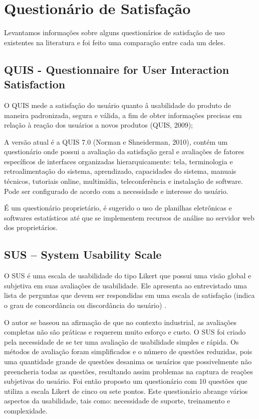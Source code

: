 \section{Questionário de Satisfação}

	Levantamos informações sobre alguns questionários de satisfação de uso existentes na literatura e foi feito uma comparação entre cada um deles.

\subsection{QUIS - Questionnaire for User Interaction Satisfaction}

	O QUIS mede a satisfação do usuário quanto â usabilidade do produto de maneira padronizada, segura e válida, a fim de obter informações precisas em relação à reação dos usuários a novos produtos (QUIS, 2009);

	A versão atual é a QUIS 7.0 (Norman e Shneiderman, 2010), contém um questionário onde possui a avaliação da satisfação geral e avaliações de fatores específicos de interfaces organizadas hierarquicamente: tela, terminologia e retroalimentação do sistema, aprendizado, capacidades do sistema, manuais técnicos, tutoriais online, multimídia, teleconferência e instalação de software. Pode ser configurado de acordo com a necessidade e interesse do usuário. 

	É um questionário proprietário, é sugerido o uso de planilhas eletrônicas e softwares estatísticos até que se implementem recursos de análise no servidor web dos proprietários.

\subsection{SUS – System Usability Scale}

	O SUS é uma escala de usabilidade do tipo Likert que possui uma visão global e subjetiva em suas avaliações de usabilidade. Ele apresenta ao entrevistado uma lista de perguntas que devem ser respondidas em uma escala de satisfação (indica o grau de concordância ou discordância do usuário) \cite{brooke1996sus}.

	O autor se baseou na afirmação de que no contexto industrial, as avaliações completas não são práticas e requerem muito esforço e custo. O SUS foi criado pela necessidade de se ter uma avaliação de usabilidade simples e rápida. Os métodos de avaliação foram simplificados e o número de questões reduzidas, pois uma quantidade grande de questões desanima os usuários que possivelmente não preencheria todas as questões, resultando assim problemas na captura de reações subjetivas do usuário. Foi então proposto um questionário com 10 questões que utiliza a escala Likert de cinco ou sete pontos. Este questionário abrange vários aspectos da usabilidade, tais como: necessidade de suporte, treinamento e complexidade. ~\cite{preece2007}

